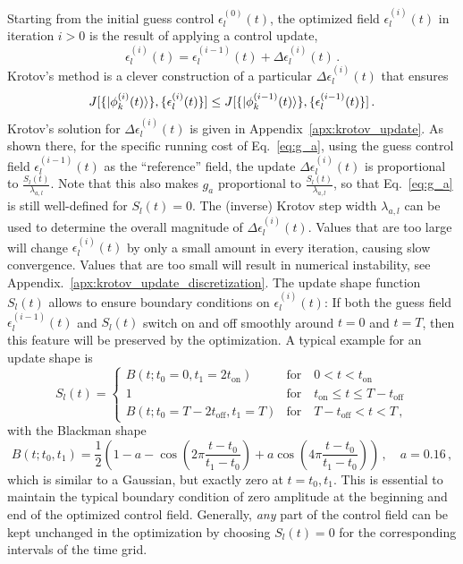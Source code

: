 \documentclass[submission, Phys]{SciPost}
\begin{document}
Starting from the initial guess control $\epsilon_l^{(0)}(t)$, the optimized
field $\epsilon_l^{(i)}(t)$ in iteration $i > 0$ is the result of applying
a control update,
\begin{equation}%
  \label{eq:eps_updated}
  \epsilon_l^{(i)}(t)
  = \epsilon_l^{(i-1)}(t) + \Delta\epsilon_l^{(i)}(t)\,.
\end{equation}
Krotov's method is a clever construction of a particular
$\Delta\epsilon_l^{(i)}(t)$ that ensures
\begin{equation*}
  J[\{\ket{\phi_k^{(i)}(t)}\}, \{\epsilon_l^{(i)}(t)\}] \leq
  J[\{\ket{\phi_k^{(i-1)}(t)}\}, \{\epsilon_l^{(i-1)}(t)\}]\,.
\end{equation*}
Krotov's solution for $\Delta\epsilon_l^{(i)}(t)$ is given
in Appendix~\ref{apx:krotov_update}.
As shown there, for the specific running cost of Eq.~\eqref{eq:g_a}, using the
guess control field $\epsilon_l^{(i-1)}(t)$ as the ``reference'' field, the
update $\Delta\epsilon^{(i)}_l(t)$ is proportional to
$\frac{S_l(t)}{\lambda_{a,l}}$.
Note that this also makes $g_a$ proportional to
$\frac{S_l(t)}{\lambda_{a,l}}$, so that Eq.~\eqref{eq:g_a} is still well-defined
for $S_l(t) = 0$.
The (inverse) Krotov step width \(\lambda_{a,l}\) can be used to
determine the overall magnitude of $\Delta\epsilon^{(i)}_l(t)$.
Values that are too large will change \(\epsilon_l^{(i)}(t)\) by only a small
amount in every iteration, causing slow convergence.
Values that are too small will result in numerical instability, see
Appendix.~\ref{apx:krotov_update_discretization}.
The update shape function $S_l(t)$ allows to ensure boundary
conditions on $\epsilon^{(i)}_l(t)$: If both the guess field
$\epsilon^{(i-1)}_l(t)$ and $S_l(t)$ switch on and off smoothly around $t=0$
and $t=T$, then this feature will be preserved by the optimization.
A typical example for an update shape is
\begin{equation}%
  \label{eq:flattop}
  S_l(t) = \begin{cases}
    B(t; t_0=0, t_1=2 t_{\text{on}})
      & \text{for} \quad 0 < t < t_{\text{on}} \\
    1 & \text{for} \quad t_{\text{on}} \le t \le T - t_{\text{off}} \\
    B(t; t_0=T-2 t_{\text{off}}, t_1=T)
      & \text{for} \quad T - t_{\text{off}} < t < T\,,
  \end{cases}
\end{equation}
with the Blackman shape
\begin{equation}%
  \label{eq:blackman}
  B(t; t_0, t_1) =
    \frac{1}{2}\left(
      1 - a - \cos\left(2\pi \frac{t - t_0}{t_1 - t_0}\right)
      + a \cos\left(4\pi \frac{t - t_0}{t_1 - t_0}\right)
    \right)\,,\quad a = 0.16\,,
\end{equation}
which is similar to a Gaussian, but exactly zero at $t = t_0, t_1$.
This is essential to maintain the typical boundary condition of zero
amplitude at the beginning and end of the optimized control field.
Generally, \emph{any} part of the control field can be kept unchanged in the
optimization by choosing $S_l(t) = 0$ for the corresponding intervals of the
time grid.
\end{document}
